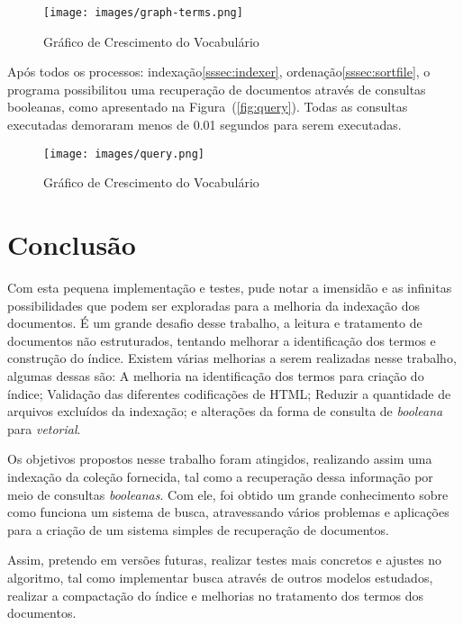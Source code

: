\documentclass[12pt]{article}
\begin{document}
\begin{figure}[ht]
\centering
\texttt{[image: images/graph-terms.png]}
\label{fig:graphNewTerms}
\caption{Gráfico de Crescimento do Vocabulário}
\end{figure}

Após todos os processos: indexação\ref{sssec:indexer}, ordenação\ref{sssec:sortfile}, o programa possibilitou uma recuperação de documentos através de consultas booleanas, como apresentado na Figura~(\ref{fig:query}). Todas as consultas executadas demoraram menos de 0.01 segundos para serem executadas.

\begin{figure}[ht]
\centering
\texttt{[image: images/query.png]}
\label{fig:graphNewTerms}
\caption{Gráfico de Crescimento do Vocabulário}
\end{figure}


\section{Conclusão} \label{sec:conclusion}

Com esta pequena implementação e testes, pude notar a imensidão e as infinitas possibilidades que podem ser exploradas para a melhoria da indexação dos documentos. É um grande desafio desse trabalho, a leitura e tratamento de documentos não estruturados, tentando melhorar a identificação dos termos e construção do índice.
Existem várias melhorias a serem realizadas nesse trabalho, algumas dessas são: A melhoria na identificação dos termos para criação do índice; Validação das diferentes codificações de HTML; Reduzir a quantidade de arquivos excluídos da indexação; e alterações da forma de consulta de \textit{booleana} para \textit{vetorial}.

Os objetivos propostos nesse trabalho foram atingidos, realizando assim uma indexação da coleção fornecida, tal como a recuperação dessa informação por meio de consultas \textit{booleanas}. Com ele, foi obtido um grande conhecimento sobre como funciona um sistema de busca, atravessando vários problemas e aplicações para a criação de um sistema simples de recuperação de documentos.

Assim, pretendo em versões futuras, realizar testes mais concretos e ajustes no algoritmo, tal como implementar busca através de outros modelos estudados, realizar a compactação do índice e melhorias no tratamento dos termos dos documentos.


\nocite{*}
\end{document}
